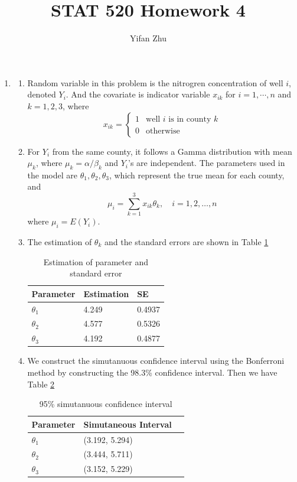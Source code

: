 \documentclass{article}
\begin{document}
	

	
	\title{STAT 520 Homework 4}
	\author{Yifan Zhu}
	\maketitle
	
	\begin{enumerate}[leftmargin = 0 em, label = 4.\arabic*., font = \bfseries]
	\item 
	\begin{enumerate}
		\item
		Random variable in this problem is the nitrogren concentration of well $i$, denoted $Y_i$. And the covariate is indicator variable $x_{ik}$ for $i = 1, \cdots, n$ and $k = 1,2,3$, where
		\[x_{ik} = \begin{cases}
			1 & \textrm{well $i$ is in county $k$}\\
			0 & \textrm{otherwise}
		\end{cases}\]


		\item 
		For $Y_i$ from the same county, it follows a Gamma distribution with mean $\mu_k$, where $\mu_k = \alpha/\beta_k$ and $Y_i$'s are independent. The parameters used in the model are $\theta_1, \theta_2, \theta_3$, which represent the true mean for each county, and
		\[\mu_i = \sum_{k=1}^3 x_{ik} \theta_k, \quad i = 1,2,\ldots, n\]
		where $\mu_i = E(Y_i)$.

		\item 
		The estimation of $\theta_k$ and the standard errors are shown in Table \ref{1par}
		\begin{table}[!htb]
		\caption{Estimation of parameter and standard error}
		\label{1par}
		\centering
			\begin{tabular}{lll}
			\toprule
				Parameter & Estimation & SE\\
				\midrule
				$\theta_1$ & 4.249 & 0.4937\\
				$\theta_2$ & 4.577 & 0.5326\\
				$\theta_3$ & 4.192 & 0.4877\\
				\bottomrule
			\end{tabular}
		\end{table}

		\item 
		We construct the simutanuous confidence interval using the Bonferroni method by constructing the 98.3\% confidence interval. Then we have Table \ref{simu_ci}
		\begin{table}[!htb]
		\caption{95\% simutanuous confidence interval}
		\label{simu_ci}
		\centering
			\begin{tabular}{lll}
			\toprule
				Parameter & Simutaneous Interval \\
				\midrule
				$\theta_1$ & (3.192, 5.294) \\
				$\theta_2$ & (3.444, 5.711) \\
				$\theta_3$ & (3.152, 5.229) \\
				\bottomrule
			\end{tabular}
		\end{table}


\end{enumerate}
\end{enumerate}
\end{document}
